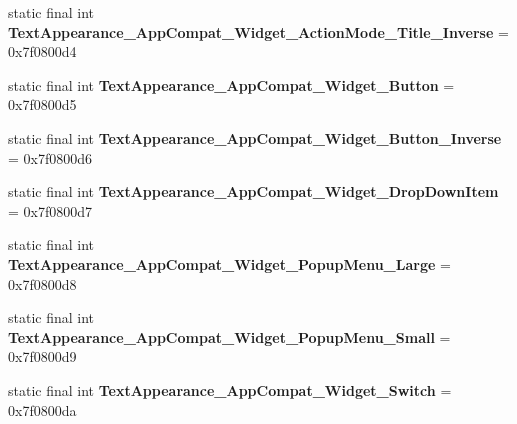 \begin{DoxyCompactItemize}
\item 
\hypertarget{classandroid_1_1support_1_1v7_1_1appcompat_1_1_r_1_1style_aac3e1610afd8a4516c6eccd16ee4476f}{}static final int {\bfseries Text\+Appearance\+\_\+\+App\+Compat\+\_\+\+Widget\+\_\+\+Action\+Mode\+\_\+\+Title\+\_\+\+Inverse} = 0x7f0800d4\label{classandroid_1_1support_1_1v7_1_1appcompat_1_1_r_1_1style_aac3e1610afd8a4516c6eccd16ee4476f}

\item 
\hypertarget{classandroid_1_1support_1_1v7_1_1appcompat_1_1_r_1_1style_a727c66b567829dccd9c00810cf31f225}{}static final int {\bfseries Text\+Appearance\+\_\+\+App\+Compat\+\_\+\+Widget\+\_\+\+Button} = 0x7f0800d5\label{classandroid_1_1support_1_1v7_1_1appcompat_1_1_r_1_1style_a727c66b567829dccd9c00810cf31f225}

\item 
\hypertarget{classandroid_1_1support_1_1v7_1_1appcompat_1_1_r_1_1style_ac142dc7e75b7e898146711016297324e}{}static final int {\bfseries Text\+Appearance\+\_\+\+App\+Compat\+\_\+\+Widget\+\_\+\+Button\+\_\+\+Inverse} = 0x7f0800d6\label{classandroid_1_1support_1_1v7_1_1appcompat_1_1_r_1_1style_ac142dc7e75b7e898146711016297324e}

\item 
\hypertarget{classandroid_1_1support_1_1v7_1_1appcompat_1_1_r_1_1style_a324d7ce5b9cf28cccb21d06ec310517e}{}static final int {\bfseries Text\+Appearance\+\_\+\+App\+Compat\+\_\+\+Widget\+\_\+\+Drop\+Down\+Item} = 0x7f0800d7\label{classandroid_1_1support_1_1v7_1_1appcompat_1_1_r_1_1style_a324d7ce5b9cf28cccb21d06ec310517e}

\item 
\hypertarget{classandroid_1_1support_1_1v7_1_1appcompat_1_1_r_1_1style_acddbaf164ab34ab838b8cd518569c0c7}{}static final int {\bfseries Text\+Appearance\+\_\+\+App\+Compat\+\_\+\+Widget\+\_\+\+Popup\+Menu\+\_\+\+Large} = 0x7f0800d8\label{classandroid_1_1support_1_1v7_1_1appcompat_1_1_r_1_1style_acddbaf164ab34ab838b8cd518569c0c7}

\item 
\hypertarget{classandroid_1_1support_1_1v7_1_1appcompat_1_1_r_1_1style_a0bd9421bc05565e838564318f68e8109}{}static final int {\bfseries Text\+Appearance\+\_\+\+App\+Compat\+\_\+\+Widget\+\_\+\+Popup\+Menu\+\_\+\+Small} = 0x7f0800d9\label{classandroid_1_1support_1_1v7_1_1appcompat_1_1_r_1_1style_a0bd9421bc05565e838564318f68e8109}

\item 
\hypertarget{classandroid_1_1support_1_1v7_1_1appcompat_1_1_r_1_1style_a044e8db0d422a2d88ab08436b642f8f1}{}static final int {\bfseries Text\+Appearance\+\_\+\+App\+Compat\+\_\+\+Widget\+\_\+\+Switch} = 0x7f0800da\label{classandroid_1_1support_1_1v7_1_1appcompat_1_1_r_1_1style_a044e8db0d422a2d88ab08436b642f8f1}


\end{DoxyCompactItemize}
